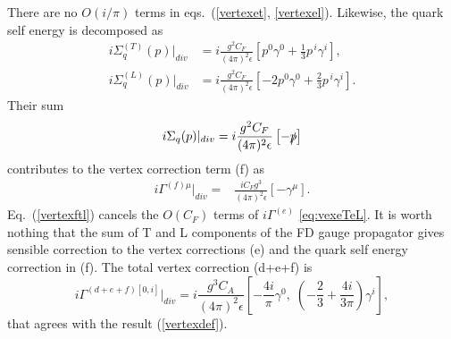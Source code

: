 \documentclass[preprint,amsmath,amssymb,superscriptaddress, floatfix,nofootinbib]{revtex4}
\begin{document}
There are no $O(i/\pi)$ terms in eqs.~(\ref{vertexet}, \ref{vertexel}). 
%
Likewise, the quark self energy is decomposed as 
%
\begin{subequations}
\begin{align}
i\Sigma_q^{(T)}(p)|_{div}  &=i \frac{g^2 C_F}{(4\pi)^2\epsilon} \left[  
p^0\gamma^0+\frac{1}{3}{p}^{\,i}\gamma^i  \right] ,
\label{selfqt}
\\
i\Sigma_q^{(L)}(p)|_{div}  &= i\frac{g^2 C_F}{(4\pi)^2\epsilon} \left[  
-2p^0\gamma^0 + \frac{2}{3}{p}^{\,i}\gamma^i  \right] .
\label{selfql}
\end{align}
\end{subequations}
%
Their sum 
\begin{eqnarray}
    i\Sigma_q(p)|_{div} 
=
i\frac{g^2 C_F}{(4\pi)^2\epsilon} \left[-\slashed p\right]
\end{eqnarray}
%
contributes to the vertex correction term (f) as 
%
\begin{align}
i\Gamma^{(f)\mu}|_{div} = & \frac{iC_F g^3}{(4\pi)^2\epsilon}
\left[ - \gamma^{\mu} \right] . 
\label{vertexftl}
\end{align}
%
Eq.~(\ref{vertexftl}) cancels the $O(C_F)$ terms of 
$i\Gamma^{(e)}$ \eqref{eq:vexeTeL}. 
%
It is worth nothing that the sum of T and L components of the FD gauge propagator gives 
sensible correction to the vertex corrections (e) and the quark self energy correction in (f).
The total vertex correction (d+e+f) is 
%
\begin{equation}
i\Gamma^{(d+e+f)[0,i]}|_{div} = i\frac{g^3 C_A }{(4\pi)^2\epsilon} 
\left[ -\frac{4i}{\pi}\gamma^0, \; \left( -\frac{2}{3}+\frac{4i}{3\pi} \right) \gamma^i 
\right] , 
\end{equation}
%
that agrees with the result (\ref{vertexdef}). 
\end{document}
